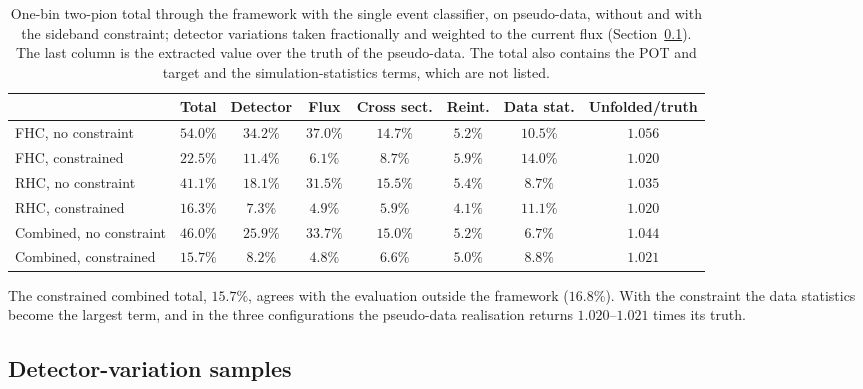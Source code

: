 \documentclass[11pt,a4paper]{article}
\begin{document}
\begin{table}[H]
  \centering
  \caption{One-bin two-pion total through the framework with the single event classifier, on pseudo-data, without and with the sideband
    constraint; detector variations taken fractionally and weighted to the current flux
    (Section~\ref{sec:detvar}). The last column is the extracted value over the truth of the pseudo-data. The
    total also contains the POT and target and the simulation-statistics terms, which are not listed.}
  \label{tab:framework}
  \footnotesize\setlength{\tabcolsep}{4pt}
  \begin{tabular}{lccccccc}
    \toprule
    & Total & Detector & Flux & Cross sect. & Reint. & Data stat. & Unfolded/truth \\
    \midrule
    FHC, no constraint       & $54.0\%$ & $34.2\%$ & $37.0\%$ & $14.7\%$ & $5.2\%$ & $10.5\%$ & $1.056$ \\
    FHC, constrained         & $22.5\%$ & $11.4\%$ & $6.1\%$  & $8.7\%$  & $5.9\%$ & $14.0\%$ & $1.020$ \\
    RHC, no constraint       & $41.1\%$ & $18.1\%$ & $31.5\%$ & $15.5\%$ & $5.4\%$ & $8.7\%$  & $1.035$ \\
    RHC, constrained         & $16.3\%$ & $7.3\%$  & $4.9\%$  & $5.9\%$  & $4.1\%$ & $11.1\%$ & $1.020$ \\
    Combined, no constraint  & $46.0\%$ & $25.9\%$ & $33.7\%$ & $15.0\%$ & $5.2\%$ & $6.7\%$  & $1.044$ \\
    Combined, constrained    & $15.7\%$ & $8.2\%$  & $4.8\%$  & $6.6\%$  & $5.0\%$ & $8.8\%$  & $1.021$ \\
    \bottomrule
  \end{tabular}
\end{table}

The constrained combined total, $15.7\%$, agrees with the evaluation outside the framework
($16.8\%$). With the constraint the data statistics become the largest term, and in the three
configurations the pseudo-data realisation returns $1.020$--$1.021$ times its truth.

\subsection{Detector-variation samples}
\label{sec:detvar}
\end{document}
